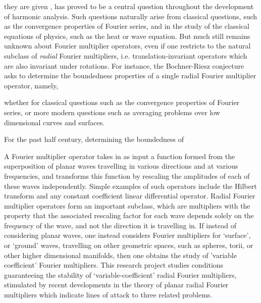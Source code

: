 \documentclass[12pt]{article}
\theoremstyle{plain}
\theoremstyle{remark}
\theoremstyle{definition}
\begin{document}
 they are given , has proved to be a central question throughout the development of harmonic analysis. Such questions naturally arise from classical questions, such as the convergence properties of Fourier series, and in the study of the classical equations of physics, such as the heat or wave equation. But much still remains unknown about Fourier multiplier operators, even if one restricts to the natural subclass of \emph{radial} Fourier multipliers, i.e. translation-invariant operators which are also invariant under rotations. For instance, the Bochner-Riesz conjecture asks to determine the boundedness properties of a single radial Fourier multiplier operator, namely, 


 whether for classical questions such as the convergence properties of Fourier series, or more modern questions such as averaging problems over low dimensional curves and surfaces.

For the past half century, determining the boundedness of

A Fourier multiplier operator takes in as input a function formed from the superposition of planar waves travelling in various directions and at various frequencies, and transforms this function by rescaling the amplitudes of each of these waves independently. Simple examples of such operators include the Hilbert transform and any constant coefficient linear differential operator. Radial Fourier multiplier operators form an important subclass, which are multipliers with the property that the associated rescaling factor for each wave depends solely on the frequency of the wave, and not the direction it is travelling in. If instead of considering planar waves, one instead considers Fourier multipliers for `surface', or `ground' waves, travelling on other geometric spaces, such as spheres, torii, or other higher dimensional manifolds, then one obtains the study of 'variable coefficient' Fourier multipliers. This research project studies conditions guaranteeing the stability of `variable-coefficient' radial Fourier multipliers, stimulated by recent developments in the theory of planar radial Fourier multipliers which indicate lines of attack to three related problems.
\end{document}
